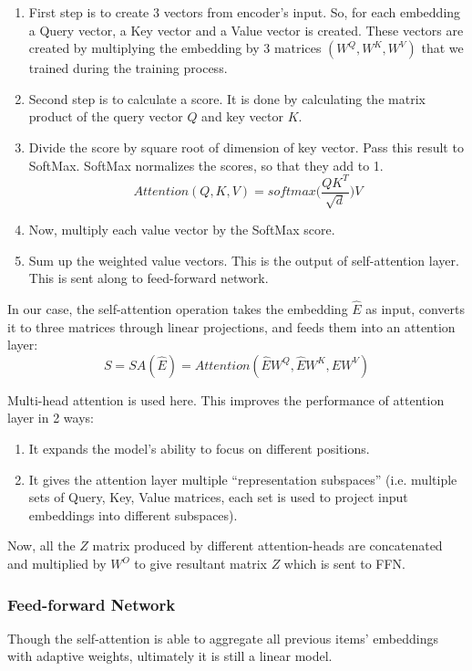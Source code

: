\documentclass[11pt]{article}
\begin{document}
	\begin{enumerate}
	\item First step is to create 3 vectors from encoder’s input. So, for each embedding a Query vector, a Key vector and a Value vector is created. These vectors are created by multiplying the embedding by 3 matrices $(W^{Q},W^{K},W^{V})$ that we trained during the training process.
	\item Second step is to calculate a score. It is done by calculating the matrix  product of the query vector $Q$ and key vector $K$.
	\item Divide the score by square root of dimension of key vector. Pass this result to SoftMax. SoftMax normalizes the scores, so that they add to 1.
	\[Attention (Q,K,V) = softmax\Bigg(\frac{QK^{T}}{\sqrt{d}}\Bigg)V\]

	\item Now, multiply each value vector by the SoftMax score.
	\item Sum up the weighted value vectors. This is the output of self-attention layer. This is sent along to feed-forward network.
	
	\end{enumerate}
	In our case, the self-attention operation takes
the embedding $\hat E$ as input, converts it to three matrices through
linear projections, and feeds them into an attention layer:
	\[ S = SA(\hat{E}) = Attention(\hat{E}W^{Q},\hat{E}W^{K},\hat{E}W^{V})  \]

Multi-head attention is used here. This improves the performance of attention layer in 2 ways:
\begin{enumerate}
	\item It expands the model’s ability to focus on different positions.
	\item It gives the attention layer multiple “representation subspaces” (i.e. multiple sets of Query, Key, Value matrices, each set is used to project input embeddings into different subspaces). 
\end{enumerate}
Now, all the $Z$ matrix produced by different attention-heads are concatenated and multiplied by $W^{O}$ to give resultant matrix $Z$ which is sent to FFN.

	\subsubsection{Feed-forward Network}
Though the self-attention is able to aggregate all previous items’ embeddings
with adaptive weights, ultimately it is still a linear model. 
	
\end{document}
